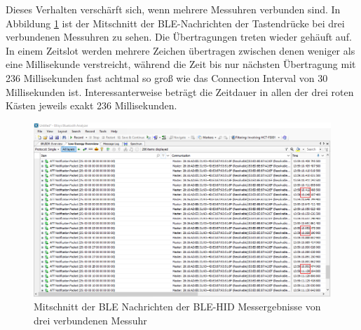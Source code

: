 Dieses Verhalten verschärft sich, wenn mehrere Messuhren verbunden sind. In Abbildung \ref{fig:MitschnittDreiMessuhr} ist der Mitschnitt der BLE-Nachrichten der Tastendrücke bei drei verbundenen Messuhren zu sehen. Die Übertragungen treten wieder gehäuft auf. In einem Zeitslot werden mehrere Zeichen übertragen zwischen denen weniger als eine Millisekunde verstreicht, während die Zeit bis nur nächsten Übertragung mit 236 Millisekunden fast achtmal so groß wie das Connection Interval von 30 Millisekunden ist. Interessanterweise beträgt die Zeitdauer in allen der drei roten Kästen jeweils exakt 236 Millisekunden.
\begin{figure}[H] 
	\centering
	\includegraphics[width=\textwidth]{figures/BLEHID2device.png}
	\caption{Mitschnitt der BLE Nachrichten der BLE-HID Messergebnisse von drei verbundenen Messuhr}
	\label{fig:MitschnittDreiMessuhr}
\end{figure}

